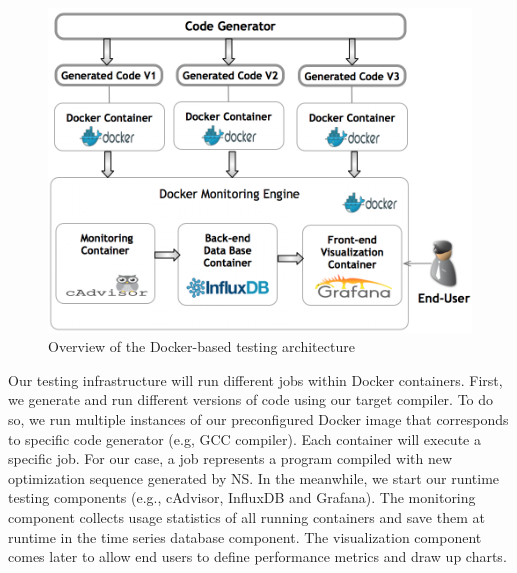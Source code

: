 \begin{figure}[h]
	\includegraphics[width=1.\linewidth]{Ressources/infra.png}
	\caption{Overview of the Docker-based testing architecture}
\end{figure}


Our testing infrastructure will run different jobs within Docker containers. First, we generate and run different versions of code using our target compiler. To do so, we run multiple instances of our preconfigured Docker image that corresponds to specific code generator (e.g, GCC compiler). Each container will execute a specific job. For our case, a job represents a program compiled with new optimization sequence generated by NS. In the meanwhile, we start our runtime testing components (e.g., cAdvisor, InfluxDB and Grafana). The monitoring component collects usage statistics of all running containers and save them at runtime in the time series database component. The visualization component comes later to allow end users to define performance metrics and draw up charts.
